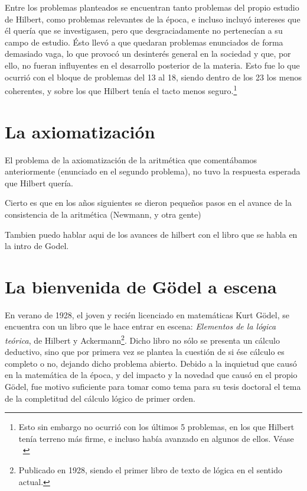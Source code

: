 Entre los problemas planteados se encuentran tanto problemas del propio estudio de Hilbert, como problemas relevantes de la época, e incluso incluyó intereses que él quería que se
investigasen, pero que desgraciadamente no pertenecían a su campo de estudio. Ésto llevó a que quedaran problemas enunciados de forma demasiado vaga, lo que provocó un desinterés 
general en la sociedad y que, por ello, no fueran influyentes en el desarrollo posterior de la materia. Esto fue lo que ocurrió con el bloque de problemas del 13 al 18, siendo dentro
de los 23 los menos coherentes, y sobre los que Hilbert tenía el tacto menos seguro.\footnote{Esto sin embargo no ocurrió con los últimos 5 problemas, en los que Hilbert tenía terreno
más firme, e incluso había avanzado en algunos de ellos. Véase ~\cite[Pág. 85]{BREZIS199876}}  


\section{La axiomatización}

El problema de la axiomatización de la aritmética que comentábamos anteriormente (enunciado en el segundo problema), no tuvo la respuesta esperada que Hilbert quería. 

Cierto es que en los años siguientes se dieron pequeños pasos en el avance de la consistencia de la aritmética (Newmann, y otra gente)

Tambien puedo hablar aqui de los avances de hilbert con el libro que se habla en la intro de Godel.


\section{La bienvenida de Gödel a escena}

En verano de 1928, el joven y recién licenciado en matemáticas Kurt Gödel, se encuentra con un libro que le hace entrar en escena: \textit{Elementos de la lógica teórica}, de 
Hilbert y Ackermann\footnote{Publicado en 1928, siendo el primer libro de texto de lógica en el sentido actual.}. Dicho libro no sólo se presenta un cálculo deductivo, 
sino que por primera vez se plantea la cuestión de si ése cálculo es completo o no, dejando dicho problema abierto. Debido a la inquietud que causó en la matemática de la época,
y del impacto y la novedad que causó en el propio Gödel, fue motivo suficiente para tomar como tema para su tesis doctoral el tema de la completitud del cálculo lógico de primer orden.

